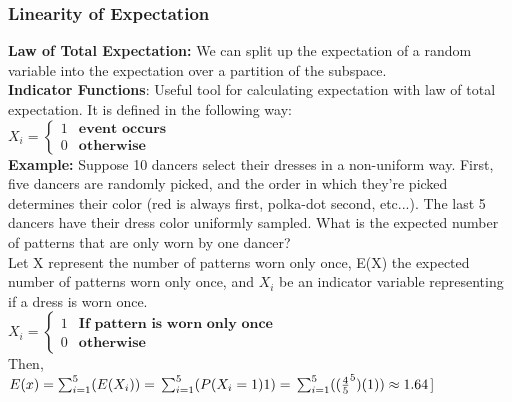 \documentclass{article}
\begin{document}
\begin{spacing}{1.5}
\subsubsection{Linearity of Expectation}
\label{sec:lexpectation}
\textbf{Law of Total Expectation:} We can split up the expectation of a random variable into the expectation over a partition of the subspace.\\
\textbf{Indicator Functions}: Useful tool for calculating expectation with law of total expectation. It is defined in the following way:\\
$X_i = \begin{cases}
    1 & \textbf{event occurs}\\
    0 & \textbf{otherwise}
\end{cases}$\\
\textbf{Example:} Suppose 10 dancers select their dresses in a non-uniform way. First, five dancers are randomly picked, and the order in which they're picked determines their color (red is always first, polka-dot second, etc...). The last 5 dancers have their dress color uniformly sampled. What is the expected number of patterns that are only worn by one dancer?\\
Let X represent the number of patterns worn only once, E(X) the expected number of patterns worn only once, and $X_i$ be an indicator variable representing if a dress is worn once.\\
$X_i = \begin{cases}
    1 & \textbf{If pattern is worn only once}\\
    0 & \textbf{otherwise}
\end{cases}$\\
Then,\\
$E(x) = \sum_{i=1}^5(E(X_i))=\\
\sum_{i=1}^5(P(X_i=1)1)=\\
\sum_{i=1}^5((\frac{4}{5}^5)(1))\\
\approx 1.64$]\newpage

\end{spacing}
\end{document}
